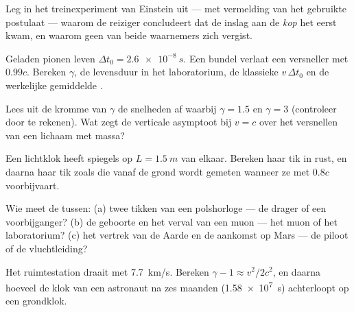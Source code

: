 \begin{exercise}[$\star$]\label{exo:g12:special-relativity:5}
Leg in het treinexperiment van Einstein uit --- met vermelding van het gebruikte
postulaat --- waarom de reiziger concludeert dat de inslag aan de \emph{kop}
het eerst kwam, en waarom geen van beide waarnemers zich vergist.
\end{exercise}

\begin{exercise}[$\star\star$]\label{exo:g12:special-relativity:6}
Geladen pionen leven $\Delta t_0 = \qty{2.6e-8}{s}$. Een bundel verlaat een
versneller met $0.99c$. Bereken $\gamma$, de levensduur in het laboratorium, de
klassieke  $v\,\Delta t_0$ en de werkelijke gemiddelde .
\end{exercise}

\begin{exercise}[$\star\star$]\label{exo:g12:special-relativity:7}
Lees uit de kromme van $\gamma$ de snelheden af waarbij $\gamma = 1.5$ en
$\gamma = 3$ (controleer door te rekenen). Wat zegt de verticale asymptoot bij
$v = c$ over het versnellen van een lichaam met massa?
\end{exercise}

\begin{exercise}[$\star\star$]\label{exo:g12:special-relativity:8}
Een lichtklok heeft spiegels op $L = \qty{1.5}{m}$ van elkaar. Bereken haar tik
in rust, en daarna haar tik zoals die vanaf de grond wordt gemeten wanneer ze
met $0.8c$ voorbijvaart.
\end{exercise}

\begin{exercise}[$\star\star$]\label{exo:g12:special-relativity:9}
Wie meet de  tussen: (a) twee tikken van een polshorloge --- de drager
of een voorbijganger? (b) de geboorte en het verval van een muon --- het muon of
het laboratorium? (c) het vertrek van de Aarde en de aankomst op Mars --- de
piloot of de vluchtleiding?
\end{exercise}

\begin{exercise}[$\star\star$]\label{exo:g12:special-relativity:10}
Het ruimtestation draait met \qty{7.7}{km/s}. Bereken
$\gamma - 1 \approx v^2/2c^2$, en daarna hoeveel de klok van een astronaut na
zes maanden (\qty{1.58e7}{s}) achterloopt op een grondklok.
\end{exercise}

